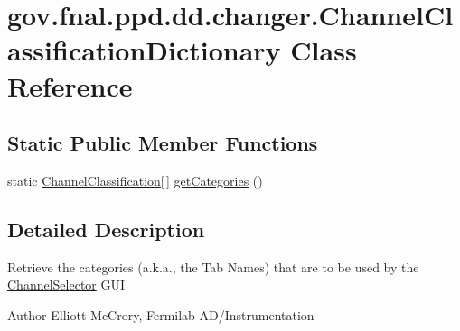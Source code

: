 \hypertarget{classgov_1_1fnal_1_1ppd_1_1dd_1_1changer_1_1ChannelClassificationDictionary}{\section{gov.\-fnal.\-ppd.\-dd.\-changer.\-Channel\-Classification\-Dictionary Class Reference}
\label{classgov_1_1fnal_1_1ppd_1_1dd_1_1changer_1_1ChannelClassificationDictionary}
}
\subsection*{Static Public Member Functions}
\begin{DoxyCompactItemize}
\item 
static \hyperlink{classgov_1_1fnal_1_1ppd_1_1dd_1_1changer_1_1ChannelClassification}{Channel\-Classification}\mbox{[}$\,$\mbox{]} \hyperlink{classgov_1_1fnal_1_1ppd_1_1dd_1_1changer_1_1ChannelClassificationDictionary_a586c766b8a6072e727bdae5d5d8c8b63}{get\-Categories} ()
\end{DoxyCompactItemize}


\subsection{Detailed Description}
Retrieve the categories (a.\-k.\-a., the Tab Names) that are to be used by the \hyperlink{classgov_1_1fnal_1_1ppd_1_1dd_1_1ChannelSelector}{Channel\-Selector} G\-U\-I

\begin{DoxyAuthor}{Author}
Elliott Mc\-Crory, Fermilab A\-D/\-Instrumentation 
\end{DoxyAuthor}


